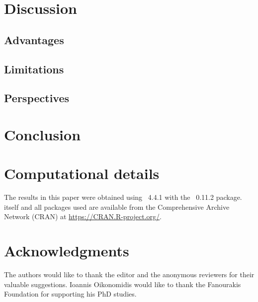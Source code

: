 \documentclass[nojss]{jss}
\begin{document}
\section[Discussion]{Discussion}

\subsection[Advantages]{Advantages}

\subsection[Limitations]{Limitations}

\subsection[Perspectives]{Perspectives}

\section[Conclusion]{Conclusion}

\section*{Computational details}

The results in this paper were obtained using
~4.4.1 with the
~0.11.2 package.  itself
and all packages used are available from the Comprehensive
 Archive Network (CRAN) at
\url{https://CRAN.R-project.org/}.

\section*{Acknowledgments}

\begin{leftbar}
The authors would like to thank the editor and the anonymous reviewers for their valuable suggestions. Ioannis Oikonomidis would like to thank the Fanourakis Foundation for supporting his PhD studies.
\end{leftbar}



\end{document}
